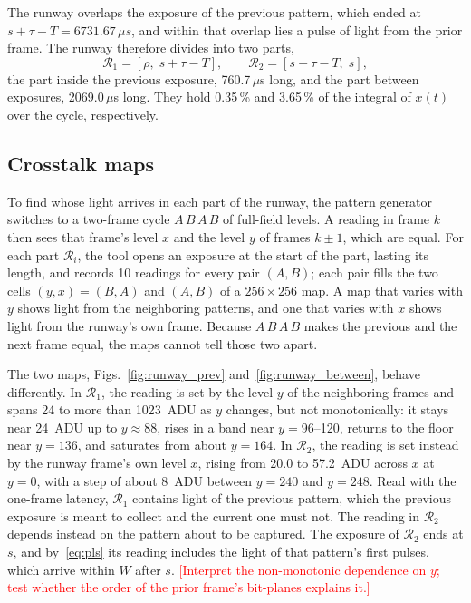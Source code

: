 \documentclass[10pt,journal,compsoc]{IEEEtran}
\newcommand{\SI}[2]{#1\,#2}
\newcommand{\micro}{\ensuremath{\mu}}
\newcommand{\second}{s}\newcommand{\hertz}{Hz}\newcommand{\metre}{m}
\newcommand{\percent}{\%}
\newcommand{\pending}[1]{\textcolor{red}{[#1]}}
\begin{document}
The runway overlaps the exposure of the previous pattern, which ended at
$s+\tau-T=\SI{6731.67}{\micro\second}$, and within that overlap lies a pulse of light from the
prior frame. The runway therefore divides into two parts,
\begin{equation}
\mathcal R_1=[\rho,\; s+\tau-T], \qquad \mathcal R_2=[s+\tau-T,\; s],
\end{equation}
the part inside the previous exposure, \SI{760.7}{\micro\second} long, and the part between
exposures, \SI{2069.0}{\micro\second} long. They hold \SI{0.35}{\percent} and \SI{3.65}{\percent}
of the integral of $x(t)$ over the cycle, respectively.

\subsection{Crosstalk maps}
\label{sec:crosstalk}
To find whose light arrives in each part of the runway, the pattern generator switches to a
two-frame cycle $A\,B\,A\,B$ of full-field levels. A reading in frame $k$ then sees that frame's
level $x$ and the level $y$ of frames $k\pm1$, which are equal. For each part $\mathcal R_i$, the
tool opens an exposure at the start of the part, lasting its length, and records 10 readings for
every pair $(A,B)$; each pair fills the two cells $(y,x)=(B,A)$ and $(A,B)$ of a $256\times256$
map. A map that varies with $y$ shows light from the neighboring patterns, and one that varies
with $x$ shows light from the runway's own frame. Because $A\,B\,A\,B$ makes the previous and the
next frame equal, the maps cannot tell those two apart.

The two maps, Figs.~\ref{fig:runway_prev} and~\ref{fig:runway_between}, behave differently. In $\mathcal R_1$, the reading is set by
the level $y$ of the neighboring frames and spans 24 to more than 1023~ADU as $y$ changes, but
not monotonically: it stays near 24~ADU up to $y\approx88$, rises in a band near $y=96$--120,
returns to the floor near $y=136$, and saturates from about $y=164$. In $\mathcal R_2$, the
reading is set instead by the runway frame's own level $x$, rising from 20.0 to 57.2~ADU across
$x$ at $y=0$, with a step of about 8~ADU between $y=240$ and $y=248$. Read with the one-frame
latency, $\mathcal R_1$ contains light of the previous pattern, which the previous exposure is
meant to collect and the current one must not. The reading in $\mathcal R_2$ depends instead on
the pattern about to be captured. The exposure of $\mathcal R_2$ ends at $s$, and by~\eqref{eq:pls}
its reading includes the light of that pattern's first pulses, which arrive within $W$ after $s$. \pending{Interpret the non-monotonic dependence on $y$; test
whether the order of the prior frame's bit-planes explains it.}
\end{document}
